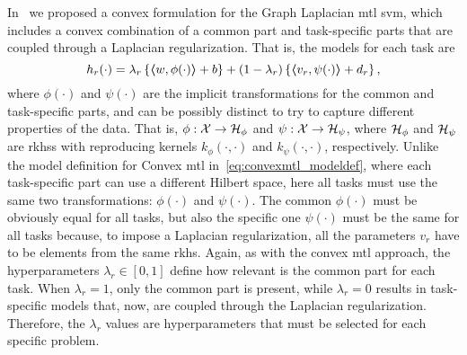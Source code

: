 In~\cite{RuizAD20} we proposed a convex formulation for the Graph Laplacian \acrshort{mtl} \acrshort{svm}, which includes a convex combination of a common part and task-specific parts that are coupled through a Laplacian regularization.
That is, the models for each task are
\begin{equation}
    \nonumber
    h_r({\cdot}) = \lambda_r \left\lbrace \bm{\left\langle} w, \phi(\cdot) \bm{\right\rangle} + b  \right\rbrace + (1 - \lambda_r) \left\lbrace \bm{\left\langle} {v}_r, \psi(\cdot) \bm{\right\rangle} + d_r \right\rbrace ,
\end{equation}
where $\phi(\cdot)$ and $\psi(\cdot)$ are the implicit transformations for the common and task-specific parts, and can be possibly distinct to try to capture different properties of the data.
That is, $\phi: \mathcal{X} \to \mathcal{H}_\phi$ and $\psi: \mathcal{X} \to \mathcal{H}_\psi$, where $\mathcal{H}_\phi$ and $\mathcal{H}_\psi$ are \acrshort{rkhss} with reproducing kernels $k_\phi(\cdot, \cdot)$ and $k_\psi(\cdot, \cdot)$, respectively.
Unlike the model definition for Convex \acrshort{mtl} in~\eqref{eq:convexmtl_modeldef}, where each task-specific part can use a different Hilbert space, here all tasks must use the same two transformations: $\phi(\cdot)$ and $\psi(\cdot)$. The common $\phi(\cdot)$ must be obviously equal for all tasks, but also the specific one $\psi(\cdot)$ must be the same for all tasks because, to impose a Laplacian regularization, all the parameters $v_r$ have to be elements from the same \acrshort{rkhs}.
Again, as with the convex \acrshort{mtl} approach, the hyperparameters $\lambda_r \in [0, 1]$ define how relevant is the common part for each task. When $\lambda_r=1$, only the common part is present, while $\lambda_r=0$ results in task-specific models that, now, are coupled through the Laplacian regularization.
%
Therefore, the $\lambda_r$ values are hyperparameters that must be selected for each specific problem.

